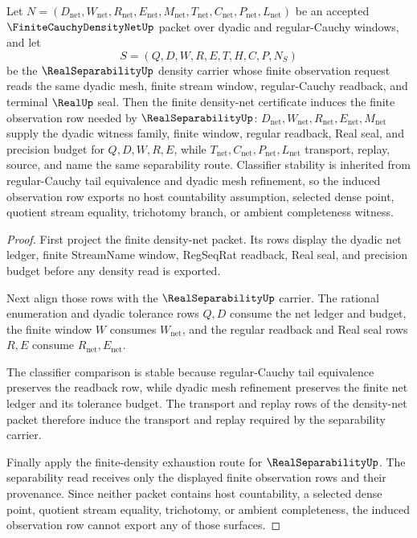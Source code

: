 \begin{theorem}
\label{thm:finite-cauchy-density-net-real-separability-link}
Let $N=(D_{\mathrm{net}},W_{\mathrm{net}},R_{\mathrm{net}},E_{\mathrm{net}},M_{\mathrm{net}},T_{\mathrm{net}},C_{\mathrm{net}},P_{\mathrm{net}},L_{\mathrm{net}})$ be an accepted $\FiniteCauchyDensityNetUp$ packet over dyadic and regular-Cauchy windows, and let
$$
S=(Q,D,W,R,E,T,H,C,P,N_S)
$$
be the $\RealSeparabilityUp$ density carrier whose finite observation request reads the same dyadic mesh, finite stream window, regular-Cauchy readback, and terminal $\RealUp$ seal. Then the finite density-net certificate induces the finite observation row needed by $\RealSeparabilityUp$: $D_{\mathrm{net}},W_{\mathrm{net}},R_{\mathrm{net}},E_{\mathrm{net}},M_{\mathrm{net}}$ supply the dyadic witness family, finite window, regular readback, Real seal, and precision budget for $Q,D,W,R,E$, while $T_{\mathrm{net}},C_{\mathrm{net}},P_{\mathrm{net}},L_{\mathrm{net}}$ transport, replay, source, and name the same separability route. Classifier stability is inherited from regular-Cauchy tail equivalence and dyadic mesh refinement, so the induced observation row exports no host countability assumption, selected dense point, quotient stream equality, trichotomy branch, or ambient completeness witness.
\end{theorem}
\begin{proof}
First project the finite density-net packet. Its rows display the dyadic net ledger, finite StreamName window, RegSeqRat readback, Real seal, and precision budget before any density read is exported.

Next align those rows with the $\RealSeparabilityUp$ carrier. The rational enumeration and dyadic tolerance rows $Q,D$ consume the net ledger and budget, the finite window $W$ consumes $W_{\mathrm{net}}$, and the regular readback and Real seal rows $R,E$ consume $R_{\mathrm{net}},E_{\mathrm{net}}$.

The classifier comparison is stable because regular-Cauchy tail equivalence preserves the readback row, while dyadic mesh refinement preserves the finite net ledger and its tolerance budget. The transport and replay rows of the density-net packet therefore induce the transport and replay required by the separability carrier.

Finally apply the finite-density exhaustion route for $\RealSeparabilityUp$. The separability read receives only the displayed finite observation rows and their provenance. Since neither packet contains host countability, a selected dense point, quotient stream equality, trichotomy, or ambient completeness, the induced observation row cannot export any of those surfaces.
\end{proof}
